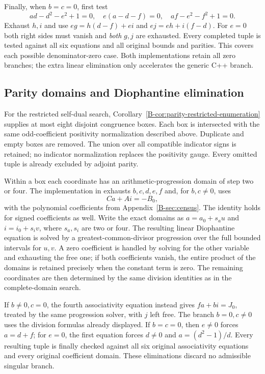 \documentclass[11pt]{article}
\begin{document}
Finally, when $b=c=0$, first test
\[
 ad-d^2-e^2+1=0,\quad e(a-d-f)=0,\quad af-e^2-f^2+1=0.
\]
Exhaust $h,i$ and use
$eg=h(d-f)+ei$ and $ej=eh+i(f-d)$. For $e=0$ both right sides must
vanish and \emph{both} $g,j$ are exhausted. Every completed tuple is
tested against all six equations and all original bounds and parities.
This covers each possible denominator-zero case. Both implementations retain all zero branches; the extra linear
elimination only accelerates the generic C++ branch.

\subsection{Parity domains and Diophantine elimination}
For the restricted self-dual search,
Corollary~\ref{B-cor:parity-restricted-enumeration} supplies at most eight
disjoint congruence boxes. Each box is intersected with the same
odd-coefficient positivity normalization described above. Duplicate and
empty boxes are removed. The union over all compatible indicator signs
is retained; no indicator normalization replaces the positivity gauge.
Every omitted tuple is already excluded by adjoint parity.

Within a box each coordinate has an arithmetic-progression domain of
step two or four. The implementation in
 exhausts $b,c,d,e,f$
and, for $b,c\ne0$, uses
\[
 Ca+Ai=-B_0,
\]
with the polynomial coefficients from Appendix~\ref{B-sec:census}.
The identity holds for signed coefficients as well. Write the exact
domains as $a=a_0+s_a u$ and $i=i_0+s_i v$, where $s_a,s_i$ are
two or four. The resulting linear Diophantine equation is solved by a
greatest-common-divisor progression over the full bounded intervals
for $u,v$. A zero coefficient is handled by solving for the other
variable and exhausting the free one; if both coefficients vanish,
the entire product of the domains is retained precisely when the
constant term is zero. The remaining coordinates are then determined
by the same division identities as in the complete-domain search.

If $b\ne0,c=0$, the fourth associativity equation instead gives
$fa+bi=J_0$, treated by the same progression solver, with $j$ left
free. The branch $b=0,c\ne0$ uses the division formulas already
displayed. If $b=c=0$, then $e\ne0$ forces $a=d+f$;
for $e=0$, the first equation forces $d\ne0$ and
$a=(d^2-1)/d$. Every resulting tuple is finally checked against all
six original associativity equations and every original coefficient
domain. These eliminations discard no admissible singular branch.
\end{document}
